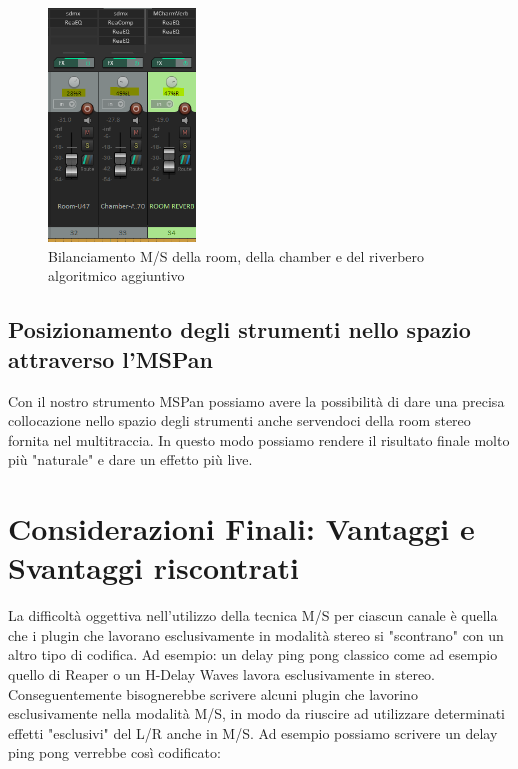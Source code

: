 \documentclass{article}
\begin{document}
   \begin{figure}[H]
        \centering
        \includegraphics[width=0.35\textwidth]{images/chamberroomrev.png}
         \caption{\label{fig10}Bilanciamento M/S della room, della chamber e del riverbero algoritmico aggiuntivo}
    \end{figure}

    \subsection{Posizionamento degli strumenti nello spazio attraverso l'MSPan}

    Con il nostro strumento MSPan possiamo avere la possibilità di dare una precisa collocazione nello spazio degli strumenti anche servendoci della room stereo fornita nel multitraccia. In questo modo possiamo rendere il risultato finale molto più "naturale" e dare un effetto più live.

\section{Considerazioni Finali: Vantaggi e Svantaggi riscontrati}

    La difficoltà oggettiva nell'utilizzo della tecnica M/S per ciascun canale è quella che i plugin che lavorano esclusivamente in modalità stereo si "scontrano" con un altro tipo di codifica. Ad esempio: un delay ping pong classico come ad esempio quello di Reaper o un H-Delay Waves lavora esclusivamente in stereo. Conseguentemente bisognerebbe scrivere alcuni plugin che lavorino esclusivamente nella modalità M/S, in modo da riuscire ad utilizzare determinati effetti "esclusivi" del L/R anche in M/S.
    Ad esempio possiamo scrivere un delay ping pong verrebbe così codificato:
\end{document}
